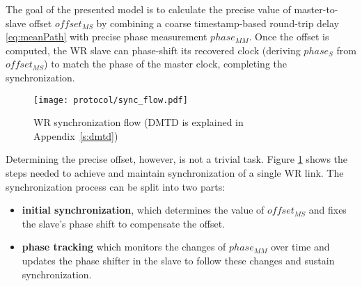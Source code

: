 The goal of the presented model is to calculate the precise value of
master-to-slave offset $offset_{MS}$ by combining a coarse timestamp-based
round-trip delay \eqref{eq:meanPath} with precise phase measurement
$phase_{MM}.$ Once the offset is computed, the WR slave can phase-shift its
recovered clock (deriving $phase_{S}$ from $offset_{MS}$) to match the phase
of the master clock, completing the synchronization.
\begin{figure}[ht!]
  \centering
  \texttt{[image: protocol/sync\_flow.pdf]}
  \caption{WR synchronization flow (DMTD is explained in Appendix~\ref{s:dmtd})}
  \label{fig:sync_flow}
\end{figure}
Determining the precise offset, however, is not a trivial task. Figure
\ref{fig:sync_flow} shows the steps needed to achieve and maintain
synchronization of a single WR link. The synchronization process can be
split into two parts: \begin{itemize}
\item \textbf{initial synchronization}, which determines the value of
$offset_{MS}$ and fixes the slave's phase shift to compensate the offset.
\item \textbf{phase tracking} which monitors the changes of $phase_{MM}$
over time and updates the phase shifter in the slave to follow these changes
and sustain synchronization.
\end{itemize}

\newpage

